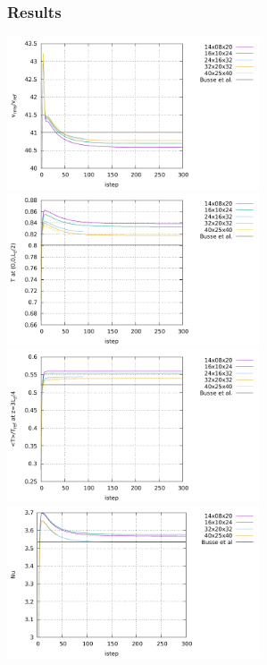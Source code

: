 \subsubsection*{Results}

\begin{center}
\includegraphics[width=7.5cm]{python_codes/fieldstone_20/images/vrms.pdf}
\includegraphics[width=7.5cm]{python_codes/fieldstone_20/images/Tmid.pdf}\\
\includegraphics[width=7.5cm]{python_codes/fieldstone_20/images/Tm.pdf}
\includegraphics[width=7.5cm]{python_codes/fieldstone_20/images/Nu.pdf}\\

\end{center}
